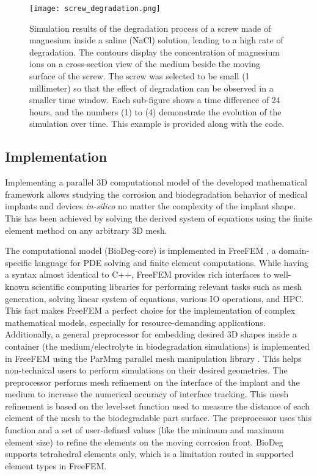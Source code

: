 \begin{figure}[h]
\centering
\medskip
\texttt{[image: screw\_degradation.png]}
\caption[Simulation result of degradation of a screw performed using BioDeg]{Simulation results of the degradation process of a screw made of magnesium inside a saline (NaCl) solution, leading to a high rate of degradation. The contours display the concentration of magnesium ions on a cross-section view of the medium beside the moving surface of the screw. The screw was selected to be small (1 millimeter) so that the effect of degradation can be observed in a smaller time window. Each sub-figure shows a time difference of 24 hours, and the numbers (1) to (4) demonstrate the evolution of the simulation over time. This example is provided along with the code.} \label{fig:screw_biodeg}
\end{figure}

\subsection{Implementation}

Implementing a parallel 3D computational model of the developed mathematical framework allows studying the corrosion and biodegradation behavior of medical implants and devices \textit{in-silico} no matter the complexity of the implant shape. This has been achieved by solving the derived system of equations using the finite element method on any arbitrary 3D mesh.

The computational model (BioDeg-core) is implemented in FreeFEM \cite{Hecht2012}, a domain-specific language for {PDE} solving and finite element computations. While having a syntax almost identical to C++, FreeFEM provides rich interfaces to well-known scientific computing libraries for performing relevant tasks such as mesh generation, solving linear system of equations, various {IO} operations, and {HPC}. This fact makes FreeFEM a perfect choice for the implementation of complex mathematical models, especially for resource-demanding applications. Additionally, a general preprocessor for embedding desired 3D shapes inside a container (the medium/electrolyte in biodegradation simulations) is implemented in FreeFEM using the ParMmg parallel mesh manipulation library \cite{Dapogny2014}. This helps non-technical users to perform simulations on their desired geometries. The preprocessor performs mesh refinement on the interface of the implant and the medium to increase the numerical accuracy of interface tracking. This mesh refinement is based on the level-set function used to measure the distance of each element of the mesh to the biodegradable part surface. The preprocessor uses this function and a set of user-defined values (like the minimum and maximum element size) to refine the elements on the moving corrosion front. BioDeg supports tetrahedral elements only, which is a limitation routed in supported element types in FreeFEM.

